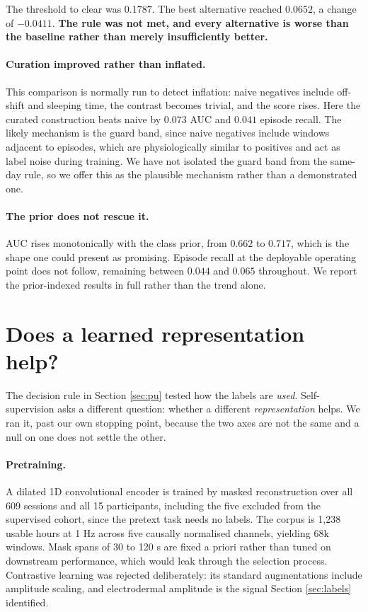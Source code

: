 \documentclass{article}
\begin{document}
The threshold to clear was $0.1787$. The best alternative reached $0.0652$, a
change of $-0.0411$. \textbf{The rule was not met, and every alternative is
worse than the baseline rather than merely insufficiently better.}

\paragraph{Curation improved rather than inflated.} This comparison is normally
run to detect inflation: naive negatives include off-shift and sleeping time,
the contrast becomes trivial, and the score rises. Here the curated
construction beats naive by $0.073$ AUC and $0.041$ episode recall. The likely
mechanism is the guard band, since naive negatives include windows adjacent to
episodes, which are physiologically similar to positives and act as label noise
during training. We have not isolated the guard band from the same-day rule,
so we offer this as the plausible mechanism rather than a demonstrated one.

\paragraph{The prior does not rescue it.} AUC rises monotonically with the
class prior, from $0.662$ to $0.717$, which is the shape one could present as
promising. Episode recall at the deployable operating point does not follow,
remaining between $0.044$ and $0.065$ throughout. We report the prior-indexed
results in full rather than the trend alone.

\section{Does a learned representation help?}
\label{sec:ssl}

The decision rule in Section \ref{sec:pu} tested how the labels are
\emph{used}. Self-supervision asks a different question: whether a different
\emph{representation} helps. We ran it, past our own stopping point, because
the two axes are not the same and a null on one does not settle the other.

\paragraph{Pretraining.} A dilated 1D convolutional encoder is trained by
masked reconstruction over all 609 sessions and all 15 participants, including
the five excluded from the supervised cohort, since the pretext task needs no
labels. The corpus is 1,238 usable hours at 1 Hz across five causally
normalised channels, yielding 68k windows. Mask spans of 30 to 120 s are fixed
a priori rather than tuned on downstream performance, which would leak through
the selection process. Contrastive learning was rejected deliberately: its
standard augmentations include amplitude scaling, and electrodermal amplitude
is the signal Section \ref{sec:labels} identified.
\end{document}
